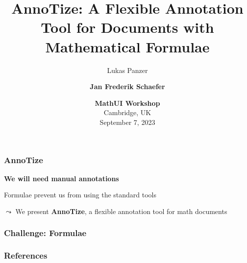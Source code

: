 \documentclass[aspectratio=169]{beamer}
\title{AnnoTize: A Flexible Annotation Tool for Documents with Mathematical Formulae}
\author{Lukas Panzer \and \textbf{Jan Frederik Schaefer}}
\institute{FAU Erlangen-N\"urnberg/KWARC}
\date{\textbf{MathUI Workshop}\\Cambridge, UK\\September 7, 2023}
\begin{document}
\frame\titlepage




\begin{frame}
    \frametitle{AnnoTize}
    {
        \centering
        \textbf{We will need manual annotations}
        \\
        \vspace{2em}\par
        Formulae prevent us from using the standard tools
        \\
        \vspace{2em}\par
        $\leadsto$ We present \textbf{AnnoTize}, a flexible annotation tool for math documents\\
    }
\end{frame}


\begin{frame}
    \frametitle{Challenge: Formulae}
\end{frame}


\begin{frame}
    \frametitle{}
\end{frame}


\begin{frame}[allowframebreaks,t]
    \frametitle{References}
    \printbibliography
\end{frame}
\end{document}
